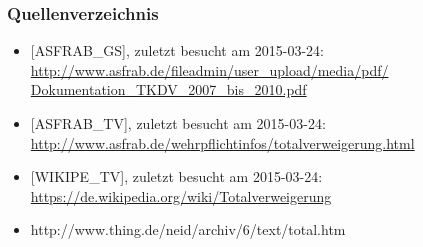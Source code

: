 \documentclass{beamer}
\begin{document}
	\begin{frame}
		\frametitle{Quellenverzeichnis}
		\begin{itemize}
			\item {[ASFRAB\_GS], zuletzt besucht am 2015-03-24:
			\href{http://www.asfrab.de/fileadmin/user_upload/media/pdf/Dokumentation_TKDV_2007_bis_2010.pdf}{http://www.asfrab.de/fileadmin/user\_upload/media/pdf/\\Dokumentation\_TKDV\_2007\_bis\_2010.pdf}}
	
			\item {[ASFRAB\_TV], zuletzt besucht am 2015-03-24: \href{http://www.asfrab.de/wehrpflichtinfos/totalverweigerung.html}{http://www.asfrab.de/wehrpflichtinfos/totalverweigerung.html}} 
			\item {[WIKIPE\_TV], zuletzt besucht am 2015-03-24: \href{https://de.wikipedia.org/wiki/Totalverweigerung}{https://de.wikipedia.org/wiki/Totalverweigerung}}
			\item http://www.thing.de/neid/archiv/6/text/total.htm
		\end{itemize}
	\end{frame}
	  
\end{document}
